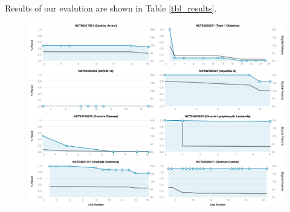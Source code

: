 \documentclass[../main.tex]{subfiles}
\begin{document}
Results of our evalution are shown in Table \ref{tbl_results}.

\begin{table}[h!]
    \small
    \centering
    
    \caption{}
    \label{tbl_results}
\end{table} 

\begin{figure}[h!]
  \includegraphics[scale=0.42]{figures/leafai_detail_results_longitudinal.png}  
\caption{}
\label{fig_leafai_results_longitudinal}
\end{figure}

\begin{table}[h!]
    \small
    \centering
    
    \caption{}
    \label{tbl_results_leafai_detail}
\end{table} 
\end{document}
